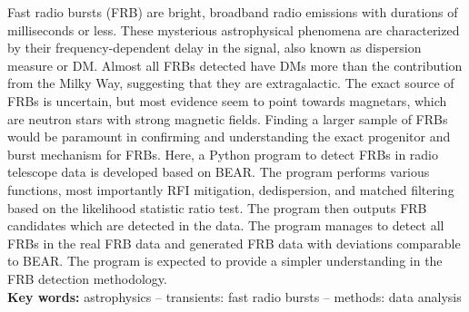 Fast radio bursts (FRB) are bright, broadband radio emissions with durations of milliseconds or less. These mysterious astrophysical phenomena are characterized by their frequency-dependent delay in the signal, also known as dispersion measure or DM. Almost all FRBs detected have DMs more than the contribution from the Milky Way, suggesting that they are extragalactic. The exact source of FRBs is uncertain, but most evidence seem to point towards magnetars, which are neutron stars with strong magnetic fields. Finding a larger sample of FRBs would be paramount in confirming and understanding the exact progenitor and burst mechanism for FRBs. Here, a Python program to detect FRBs in radio telescope data is developed based on BEAR. The program performs various functions, most importantly RFI mitigation, dedispersion, and matched filtering based on the likelihood statistic ratio test. The program then outputs FRB candidates which are detected in the data. The program manages to detect all FRBs in the real FRB data and generated FRB data with deviations comparable to BEAR. The program is expected to provide a simpler understanding in the FRB detection methodology.\\

\noindent\textbf{Key words:} astrophysics -- transients: fast radio bursts -- methods: data analysis